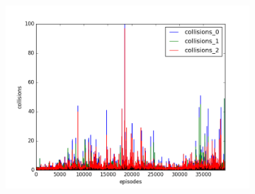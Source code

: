 \begin{figure}[t]
\begin{subfigure}[t]{\figscale\linewidth}
    \includegraphics[width=1.5\textwidth]
    {../results/maddpg_2vs1/collisions.png}
    \label{fig:maddpg-2vs1-collisions}
  \end{subfigure}


\end{figure}

